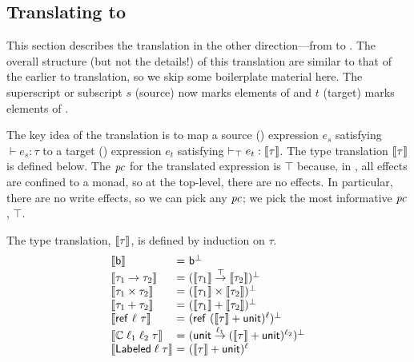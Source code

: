 \subsection{Translating {\cg} to {\fg}}
\label{sec:cg2fg}



This section describes the translation in the other direction---from
{\cg} to {\fg}. The overall structure (but not the details!) of this
translation are similar to that of the earlier {\fg} to {\cg}
translation, so we skip some boilerplate material here. The
superscript or subscript $s$ (source) now marks elements of {\cg} and
$t$ (target) marks elements of {\fg}.

The key idea of the translation is to map a source ({\cg}) expression
$e_s$ satisfying $\vdash e_s: \tau$ to a target ({\fg}) expression
$e_t$ satisfying $\vdash_\top e_t: \llbracket \tau \rrbracket$. The type translation
$\llbracket \tau \rrbracket$ is defined below. The $\mathit{pc}$ for the translated
expression is $\top$ because, in {\cg}, all effects are confined to a
monad, so at the top-level, there are no effects. In particular, there
are no write effects, so we can pick any $\mathit{pc}$; we pick the most
informative $\mathit{pc}$, $\top$.

The type translation, $\llbracket \tau \rrbracket$, is defined by induction on
$\tau$.
\[
    \begin{array}{l@{~}c@{~}l}
      \trans{\tbase} 						& = & \tbase^\bot \\
      \trans{\tau_1 \to \tau_2} 			& = &
                                                              (\trans{\tau_1} \overset{\top}{\to} \trans{\tau_2})^\bot \\
      \trans{\tau_1 \times \tau_2} 		& = & (\trans{\tau_1} \times \trans{\tau_2})^\bot \\
      \trans{\tau_1 + \tau_2} 			& = & (\trans{\tau_1} + \trans{\tau_2})^\bot \\
  \trans{\tref~ \llabel~ \tau} 		& = & (\tref~ (\trans{\tau} + \tunit)^\llabel)^\bot \\
  \trans{\tslio{\llabel_1}{\llabel_2}{\tau}}
                                  & = &
                                        (\tunit \overset{\llabel_1}{\to} (\trans{\tau} + \tunit)^{\llabel_2})^\bot\\
  \trans{\tlabeled{\llabel}{\tau}} & = & (\trans{\tau} + \tunit)^\llabel
    \end{array}
\]

